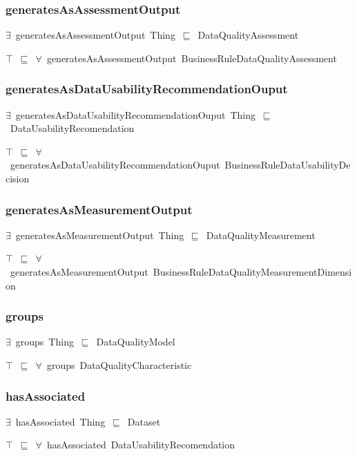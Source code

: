 \documentclass{article}
\begin{document}
\subsubsection*{generatesAsAssessmentOutput}

\ensuremath{\exists}~generatesAsAssessmentOutput~Thing~\ensuremath{\sqsubseteq}~DataQualityAssessment

\ensuremath{\top}~\ensuremath{\sqsubseteq}~\ensuremath{\forall}~generatesAsAssessmentOutput~BusinessRuleDataQualityAssessment

\subsubsection*{generatesAsDataUsabilityRecommendationOuput}

\ensuremath{\exists}~generatesAsDataUsabilityRecommendationOuput~Thing~\ensuremath{\sqsubseteq}~DataUsabilityRecomendation

\ensuremath{\top}~\ensuremath{\sqsubseteq}~\ensuremath{\forall}~generatesAsDataUsabilityRecommendationOuput~BusinessRuleDataUsabilityDecision

\subsubsection*{generatesAsMeasurementOutput}

\ensuremath{\exists}~generatesAsMeasurementOutput~Thing~\ensuremath{\sqsubseteq}~DataQualityMeasurement

\ensuremath{\top}~\ensuremath{\sqsubseteq}~\ensuremath{\forall}~generatesAsMeasurementOutput~BusinessRuleDataQualityMeasurementDimension

\subsubsection*{groups}

\ensuremath{\exists}~groups~Thing~\ensuremath{\sqsubseteq}~DataQualityModel

\ensuremath{\top}~\ensuremath{\sqsubseteq}~\ensuremath{\forall}~groups~DataQualityCharacteristic

\subsubsection*{hasAssociated}

\ensuremath{\exists}~hasAssociated~Thing~\ensuremath{\sqsubseteq}~Dataset

\ensuremath{\top}~\ensuremath{\sqsubseteq}~\ensuremath{\forall}~hasAssociated~DataUsabilityRecomendation
\end{document}
